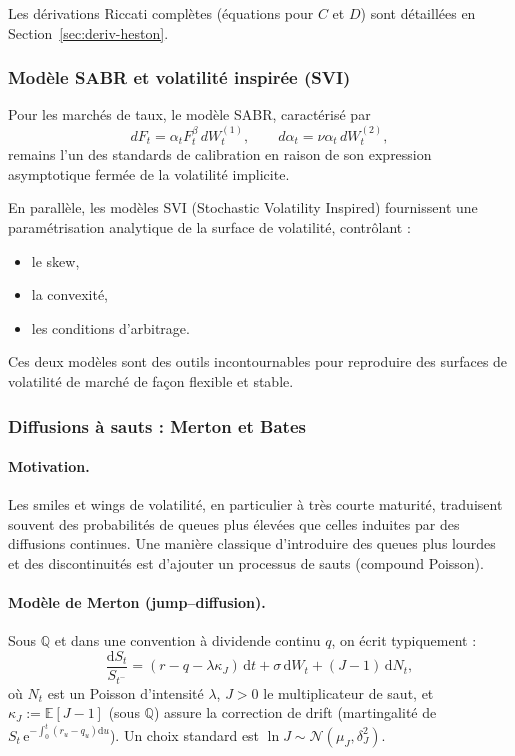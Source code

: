 \documentclass[11pt,a4paper]{article}
\newcommand{\dd}{\mathrm{d}}
\newcommand{\ee}{\mathrm{e}}
\newcommand{\E}{\mathbb{E}}
\newcommand{\QQ}{\mathbb{Q}}
\newcommand{\1}{\mathbf{1}}
\begin{document}
Les d\'erivations Riccati compl\`etes (équations pour $C$ et $D$) sont d\'etaill\'ees en
Section~\ref{sec:deriv-heston}.

\subsubsection{Mod\`ele SABR et volatilité inspirée (SVI)}

Pour les marchés de taux, le mod\`ele SABR, caractérisé par
\[
dF_t = \alpha_t F_t^\beta\, dW_t^{(1)},
\qquad
d\alpha_t = \nu \alpha_t\, dW_t^{(2)},
\]
remains l'un des standards de calibration en raison de son expression
asymptotique fermée de la volatilité implicite.

En parall\`ele, les mod\`eles SVI (Stochastic Volatility Inspired) fournissent une
paramétrisation analytique de la surface de volatilité, contr\^olant :
\begin{itemize}
  \item le skew,
  \item la convexité,
  \item les conditions d'arbitrage.
\end{itemize}

Ces deux mod\`eles sont des outils incontournables pour reproduire des surfaces
de volatilité de marché de façon flexible et stable.

\subsubsection{Diffusions \`a sauts : Merton et Bates}

\paragraph{Motivation.}
Les smiles et wings de volatilité, en particulier \`a tr\`es courte maturit\'e, traduisent souvent des probabilit\'es
de queues plus \'elev\'ees que celles induites par des diffusions continues. Une mani\`ere classique d'introduire
des queues plus lourdes et des discontinuit\'es est d'ajouter un processus de sauts (compound Poisson).

\paragraph{Mod\`ele de Merton (jump--diffusion).}
Sous $\QQ$ et dans une convention \`a dividende continu $q$, on \'ecrit typiquement :
\[
\frac{\dd S_t}{S_{t^-}}
=
(r-q-\lambda\kappa_J)\,\dd t
+
\sigma\,\dd W_t
+
(J-1)\,\dd N_t,
\]
o\`u $N_t$ est un Poisson d'intensit\'e $\lambda$, $J>0$ le multiplicateur de saut, et
$\kappa_J := \E[J-1]$ (sous $\QQ$) assure la correction de drift (martingalit\'e de $S_t\,\ee^{-\int_0^t (r_u-q_u)\dd u}$).
Un choix standard est $\ln J \sim \mathcal{N}(\mu_J,\delta_J^2)$.
\end{document}
